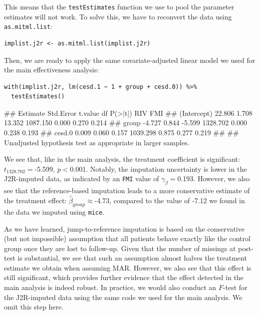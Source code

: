 This means that the \texttt{testEstimates} function we use to pool the parameter estimates will not work. To solve this, we have to reconvert the data using \texttt{as.mitml.list}:

\begin{lstlisting}
implist.j2r <- as.mitml.list(implist.j2r)
\end{lstlisting}

Then, we are ready to apply the same covariate-adjusted linear model we used for the main effectiveness analysis:

\begin{lstlisting}
with(implist.j2r, lm(cesd.1 ~ 1 + group + cesd.0)) %>%
  testEstimates()
\end{lstlisting}

\begin{example}
##              Estimate Std.Error   t.value        df P(>|t|)    RIV    FMI 
## (Intercept)    22.806     1.708    13.352  1087.150   0.000  0.270  0.214 
## group          -4.727     0.844    -5.599  1328.702   0.000  0.238  0.193 
## cesd.0          0.009     0.060     0.157  1039.298   0.875  0.277  0.219 
## 
## Unadjusted hypothesis test as appropriate in larger samples.
\end{example}


We see that, like in the main analysis, the treatment coefficient is significant: $t_{\text{1328.702}}=$-5.599, $p<$0.001. Notably, the imputation uncertainty is lower in the J2R-imputed data, as indicated by an \texttt{FMI} value of $\gamma_\beta=$0.193. However, we also see that the reference-based imputation leads to a more conservative estimate of the treatment effect: $\hat{\beta}_{\text{group}}\approx$-4.73, compared to the value of -7.12 we found in the data we imputed using \texttt{mice}. 

As we have learned, jump-to-reference imputation is based on the conservative (but not impossible) assumption that all patients behave exactly like the control group once they are lost to follow-up. Given that the number of missings at post-test is substantial, we see that such an assumption almost halves the treatment estimate we obtain when assuming MAR. However, we also see that this effect is still significant, which provides further evidence that the effect detected in the main analysis is indeed robust. In practice, we would also conduct an $F$-test for the J2R-imputed data using the same code we used for the main analysis. We omit this step here.


